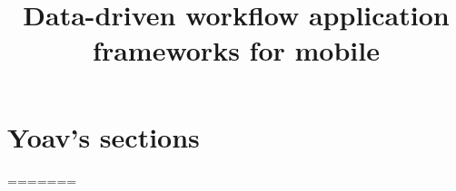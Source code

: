 \documentclass{article}
\title{Data-driven workflow application frameworks for mobile}
\begin{document}


%


\section{Yoav's sections}

%
=======

\newpage
\end{document}

